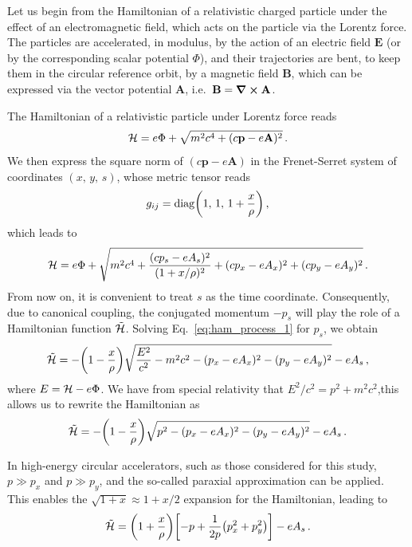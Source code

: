Let us begin from the Hamiltonian of a relativistic charged particle under the effect of an electromagnetic field, which acts on the particle via the Lorentz force. The particles are accelerated, in modulus, by the action of an electric field $\mathbf{E}$ (or by the corresponding scalar potential $\Phi$), and their trajectories are bent, to keep them in the circular reference orbit, by a magnetic field $\mathbf{B}$, which can be expressed via the vector potential $\mathbf{A}$, i.e.\ $\mathbf{B}=\curl\mathbf{A}$.

The Hamiltonian of a relativistic particle under Lorentz force reads
%
\begin{equation}
    \mathcal{H} = e\Phi + \sqrt{ m^2c^4 + (c\mathbf{p}-e\mathbf{A})^2 }\,. 
\end{equation}
%
We then express the square norm of $(c\mathbf{p}-e\mathbf{A})$ in the Frenet-Serret system of coordinates $(x,\,y,\,s)$, whose metric tensor reads
%
\begin{equation} 
    g_{ij} = \mathrm{diag}\qty(1,\,1,\,1+\frac{x}{\rho})\,, 
\end{equation}
%
which leads to
%
\begin{equation}
    \mathcal{H} = e\Phi + \sqrt{ m^2c^4 + \frac{(cp_s-eA_s)^2}{(1+x/\rho)^2 } + (cp_x-eA_x)^2+ (cp_y-eA_y)^2}\,.
    \label{eq:ham_process_1}
\end{equation}
%
From now on, it is convenient to treat $s$ as the time coordinate. Consequently, due to canonical coupling, the conjugated momentum $-p_s$ will play the role of a Hamiltonian function $\tilde{\mathcal{H}}$. Solving Eq.~\eqref{eq:ham_process_1} for $p_s$, we obtain
%
\begin{equation} 
    \tilde{\mathcal{H}} = -\qty(1-\frac{x}{\rho})\sqrt{\frac{E^2}{c^2}-m^2c^2-(p_x-eA_x)^2-(p_y-eA_y)^2} - eA_s\,,
\end{equation}
%
where $E=\mathcal{H}-e\Phi$. We have from special relativity that $E^2/c^2 = p^2 + m^2c^2$,this allows us to rewrite the Hamiltonian as
\begin{equation}
    \tilde{\mathcal{H}} = -\qty(1-\frac{x}{\rho})\sqrt{p^2-(p_x-eA_x)^2-(p_y-eA_y)^2} - eA_s\,.
\end{equation}

In high-energy circular accelerators, such as those considered for this study,  $p\gg p_x$ and $p\gg p_y$, and the so-called paraxial approximation can be applied. This enables the $\sqrt{1+x}\approx 1+x/2$ expansion for the Hamiltonian, leading to
%
\begin{equation} 
	\tilde{\mathcal{H}} = \qty(1+\frac{x}{\rho})\qty[-p + \frac{1}{2p}\qty(p_x^2+p_y^2)] -eA_s\,. 
	\label{eq:hamem}
\end{equation}

